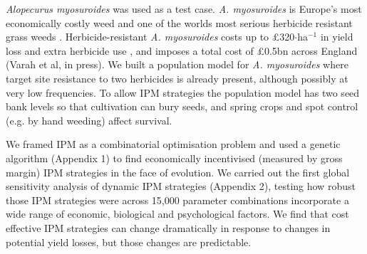 \documentclass[12pt, a4paper]{article}
\begin{document}
\textit{Alopecurus myosuroides} was used as a test case. \textit{A. myosuroides} is Europe's most economically costly weed \citep{Moss2007} and one of the worlds most serious herbicide resistant grass weeds \citep{Heap2014}. Herbicide-resistant \textit{A. myosuroides} costs up to \pounds 320$\cdot$ha$^{-1}$ in yield loss and extra herbicide use \citep{Hick2018}, and imposes a total cost of \pounds 0.5bn across England (Varah et al, in press). We built a population model for \textit{A. myosuroides} where target site resistance to two herbicides is already present, although possibly at very low frequencies. To allow IPM strategies the population model has two seed bank levels so that cultivation can bury seeds, and spring crops and spot control (e.g. by hand weeding) affect survival.  

We framed IPM as a combinatorial optimisation problem and used a genetic algorithm (Appendix 1) to find economically incentivised (measured by gross margin) IPM strategies \citep{Tayl2004GA, Carr2010} in the face of evolution. We carried out the first global sensitivity analysis of dynamic IPM strategies (Appendix 2), testing how robust those IPM strategies were across 15,000 parameter combinations incorporate a wide range of economic, biological and psychological factors. We find that cost effective IPM strategies can change dramatically in response to changes in potential yield losses, but those changes are predictable. 
\end{document}

